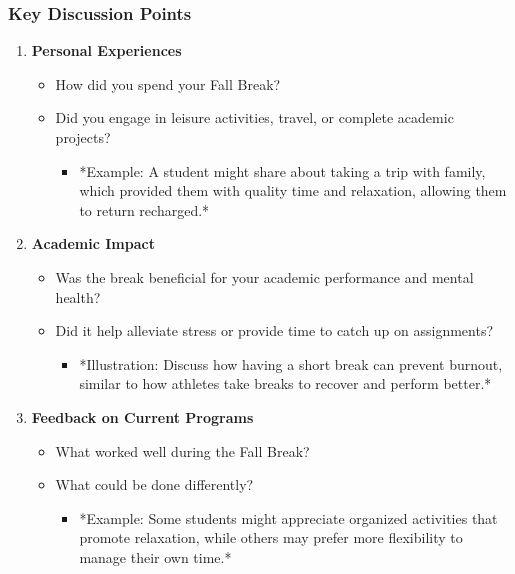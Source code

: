 \documentclass[aspectratio=169]{beamer}
\begin{document}
\begin{frame}[fragile]
    \frametitle{Key Discussion Points}
    
    \begin{enumerate}
        \item \textbf{Personal Experiences}
            \begin{itemize}
                \item How did you spend your Fall Break? 
                \item Did you engage in leisure activities, travel, or complete academic projects?
                    \begin{itemize}
                        \item *Example: A student might share about taking a trip with family, which provided them with quality time and relaxation, allowing them to return recharged.*
                    \end{itemize}
            \end{itemize}
        
        \item \textbf{Academic Impact}
            \begin{itemize}
                \item Was the break beneficial for your academic performance and mental health? 
                \item Did it help alleviate stress or provide time to catch up on assignments?
                    \begin{itemize}
                        \item *Illustration: Discuss how having a short break can prevent burnout, similar to how athletes take breaks to recover and perform better.*
                    \end{itemize}
            \end{itemize}
            
        \item \textbf{Feedback on Current Programs}
            \begin{itemize}
                \item What worked well during the Fall Break?
                \item What could be done differently?
                    \begin{itemize}
                        \item *Example: Some students might appreciate organized activities that promote relaxation, while others may prefer more flexibility to manage their own time.*
                    \end{itemize}
            \end{itemize}


\end{enumerate}
\end{frame}
\end{document}

